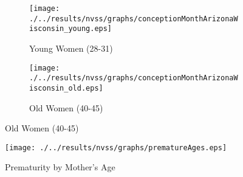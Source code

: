 \begin{figure}[htpb!]
\begin{center}
\caption{Conceptions by Month (Arizona and Wisconsin)}
\label{fig:conceptionsStates}
\begin{subfigure}{.5\textwidth}
  \centering
  \texttt{[image: ./../results/nvss/graphs/conceptionMonthArizonaWisconsin\_young.eps]}
  \caption{Young Women (28-31)}
  \label{fig:conceptionsStatesYoung}
\end{subfigure}%
\begin{subfigure}{.5\textwidth}
  \centering
  \texttt{[image: ./../results/nvss/graphs/conceptionMonthArizonaWisconsin\_old.eps]}
  \caption{Old Women (40-45)}
  \label{fig:conceptionsStatesOld}
\end{subfigure}
\end{center}	
\end{figure}

\begin{figure}[htpb!]
  \begin{center}
  \caption{Prematurity by Mother's Age}
  \label{fig:ARTuse}
  \texttt{[image: ./../results/nvss/graphs/prematureAges.eps]}
  \end{center}
\end{figure}

